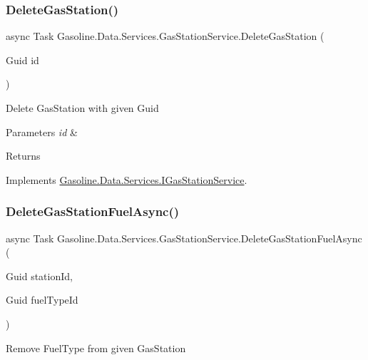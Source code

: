 \subsubsection{\texorpdfstring{DeleteGasStation()}{DeleteGasStation()}}
{\footnotesize\ttfamily async Task Gasoline.\+Data.\+Services.\+Gas\+Station\+Service.\+Delete\+Gas\+Station (\begin{DoxyParamCaption}\item[{Guid}]{id }\end{DoxyParamCaption})}



Delete Gas\+Station with given Guid 


\begin{DoxyParams}{Parameters}
{\em id} & \\
\hline
\end{DoxyParams}
\begin{DoxyReturn}{Returns}

\end{DoxyReturn}


Implements \mbox{\hyperlink{interface_gasoline_1_1_data_1_1_services_1_1_i_gas_station_service_a43d0139d482190c88cbc255af14c7837}{Gasoline.\+Data.\+Services.\+I\+Gas\+Station\+Service}}.

\mbox{\label{class_gasoline_1_1_data_1_1_services_1_1_gas_station_service_aced2362a8a06e2052178b96980c25b67}} 
\subsubsection{\texorpdfstring{DeleteGasStationFuelAsync()}{DeleteGasStationFuelAsync()}}
{\footnotesize\ttfamily async Task Gasoline.\+Data.\+Services.\+Gas\+Station\+Service.\+Delete\+Gas\+Station\+Fuel\+Async (\begin{DoxyParamCaption}\item[{Guid}]{station\+Id,  }\item[{Guid}]{fuel\+Type\+Id }\end{DoxyParamCaption})}



Remove Fuel\+Type from given Gas\+Station 


